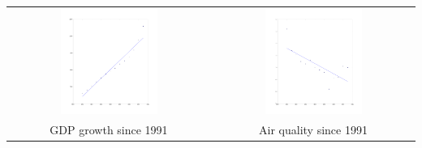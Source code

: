 \documentclass[11pt]{article}
\begin{document}
\begin{tabular}{cc}
  \includegraphics[width=0.5\textwidth]{img/growth_gdp_1991}
& \includegraphics[width=0.5\textwidth]{img/air_quality_1991}\\
   GDP growth since 1991 & Air quality since 1991
\end{tabular}

\nocite{*}


\end{document}

